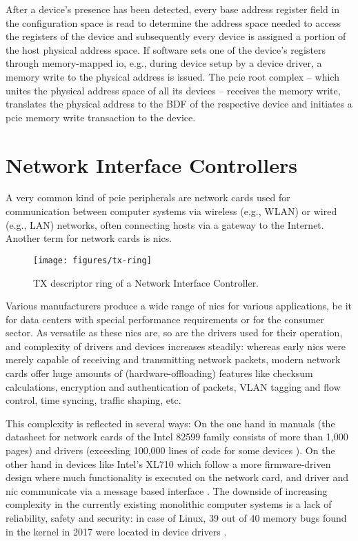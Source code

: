 After a device's presence has been detected, every base address register field
in the configuration space is read to determine the address space needed to
access the registers of the device and subsequently every device is assigned a
portion of the host physical address space. If software sets one of the device's
registers through memory-mapped \ac{io}, e.g., during device setup by a device
driver, a memory write to the physical address is issued. The \ac{pcie} root
complex -- which unites the physical address space of all its devices --
receives the memory write, translates the physical address to the BDF of the
respective device and initiates a \ac{pcie} memory write transaction to the
device.


\section{Network Interface Controllers}
\label{sec:nics}

A very common kind of \ac{pcie} peripherals are network cards used for
communication between computer systems via wireless (e.g., WLAN) or wired (e.g.,
LAN) networks, often connecting hosts via a gateway to the Internet. Another
term for network cards is \acfp{nic}.

\begin{figure}[!b]
    \centering
    \texttt{[image: figures/tx-ring]}
    \caption{TX descriptor ring of a Network Interface Controller.}
    \label{fig:tx-ring}
\end{figure}

Various manufacturers produce a wide range of \acp{nic} for various
applications, be it for data centers with special performance requirements or
for the consumer sector. As versatile as these \acp{nic} are, so are the drivers
used for their operation, and complexity of drivers and devices increases
steadily: whereas early \acp{nic} were merely capable of receiving and
transmitting network packets, modern network cards offer huge amounts of
(hardware-offloading) features like checksum calculations, encryption and
authentication of packets, VLAN tagging and flow control, time syncing, traffic
shaping, etc.

This complexity is reflected in several ways: On the one hand in manuals (the
datasheet for network cards of the Intel 82599 family \cite{intel2016datasheet}
consists of more than 1,000 pages) and drivers (exceeding 100,000 lines of code
for some devices \cite{emmerich2019case}). On the other hand in devices like
Intel's XL710 which follow a more firmware-driven design where much
functionality is executed on the network card, and driver and \ac{nic}
communicate via a message based interface \cite{emmerich2019user}. The downside
of increasing complexity in the currently existing monolithic computer systems
is a lack of reliability, safety and security: in case of Linux, 39 out of 40
memory bugs found in the kernel in 2017 were located in device drivers
\cite{emmerich2019case}.

